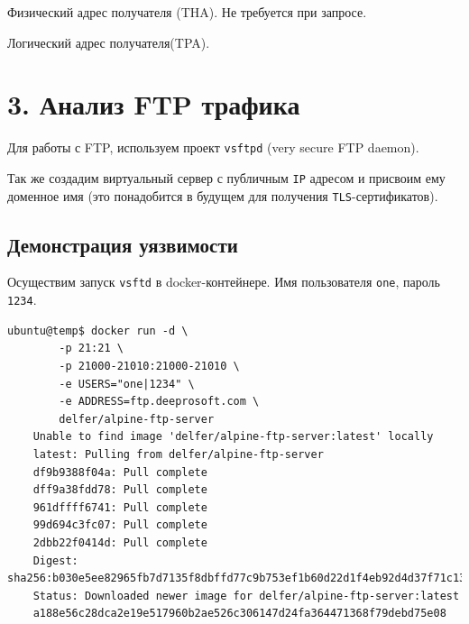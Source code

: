 Физический адрес получателя (THA). Не требуется при запросе.


Логический адрес получателя(TPA).


\section*{3. Анализ FTP трафика}

Для работы с FTP, используем проект \texttt{vsftpd} (very secure FTP daemon).

Так же создадим виртуальный сервер с публичным \texttt{IP} адресом и присвоим ему доменное имя (это понадобится в будущем для получения \texttt{TLS}-сертификатов).

\subsection*{Демонстрация уязвимости}

Осуществим запуск \texttt{vsftd} в docker-контейнере. Имя пользователя \texttt{one}, пароль \texttt{1234}.
\begin{Verbatim}[frame=single,breaklines=true,breakanywhere=true]
    ubuntu@temp$ docker run -d \
        -p 21:21 \
        -p 21000-21010:21000-21010 \
        -e USERS="one|1234" \
        -e ADDRESS=ftp.deeprosoft.com \
        delfer/alpine-ftp-server
    Unable to find image 'delfer/alpine-ftp-server:latest' locally
    latest: Pulling from delfer/alpine-ftp-server
    df9b9388f04a: Pull complete 
    dff9a38fdd78: Pull complete 
    961dffff6741: Pull complete 
    99d694c3fc07: Pull complete 
    2dbb22f0414d: Pull complete 
    Digest: sha256:b030e5ee82965fb7d7135f8dbffd77c9b753ef1b60d22d1f4eb92d4d37f71c13
    Status: Downloaded newer image for delfer/alpine-ftp-server:latest
    a188e56c28dca2e19e517960b2ae526c306147d24fa364471368f79debd75e08
\end{Verbatim}

